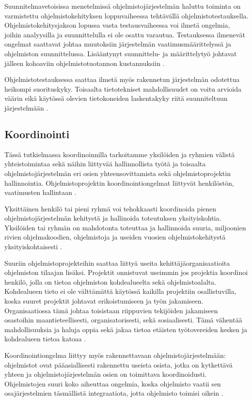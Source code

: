 \documentclass[finnish]{tktltiki2}
\theoremstyle{definition}
\theoremstyle{remark}
\begin{document}
Suunnitelmavetoisissa menetelmissä ohjelmistojärjestelmän haluttu toiminta on varmistettu ohjelmistokehityksen loppuvaiheessa tehtävällä ohjelmistotestauksella. Ohjelmistokehitysjakson lopussa vasta testausvaiheessa voi ilmetä ongelmia, joihin analyysilla ja suunnittelulla ei ole osattu varautua. Testauksessa ilmenevät ongelmat saattavat johtaa muutoksiin järjestelmän vaatimusmäärittelyssä ja ohjelmiston suunnittelussa. Lisääntynyt suunnittelu- ja määrittelytyö johtavat jälleen kohoaviin ohjelmistotuotannon kustannuksiin \cite{ROY70}.

Ohjelmistotestauksessa saattaa ilmetä myös rakennetun järjestelmän odotettua heikompi suorituskyky. Toisaalta tietotekniset mahdollisuudet on voitu arvioida väärin eikä käytössä olevien tietokoneiden laskentakyky riitä suunniteltuun järjestelmään \cite{BOE88}.
　
\subsection{Koordinointi}

Tässä tutkielmassa koordinoinnilla tarkoitamme yksilöiden ja ryhmien välistä yhteistoimintaa sekä näihin liittyvää hallinnollista työtä ja toisaalta ohjelmistojärjestelmän eri osien yhteensovittamista sekä ohjelmistoprojektin hallinnointia. Ohjelmistoprojektin koordinointiongelmat liittyvät henkilöstön, vaatimusten hallintaan \cite{KES95}.

Yksittäinen henkilö tai pieni ryhmä voi tehokkaasti koordinoida pienen ohjelmistojärjestelmän kehitystä ja hallinoida toteutuksen yksityiskohtia. Yksilöiden tai ryhmän on mahdotonta toteuttaa ja hallinnoida suuria, miljoonien rivien ohjelmakoodien, ohjelmistoja ja useiden vuosien ohjelmistokehitystä yksityiskohtaisesti \cite{KES95}.

Suuriin ohjelmistoprojekteihin saattaa liittyä useita kehittäjä\-organisaatioita ohjelmiston tilaajan lisäksi. Projektit onnistuvat useimmin jos projektia koordinoi henkilö, jolla on tietoa ohjelmiston kohdealueelta sekä ohjelmistoalalta. Kohdealueen tieto ei ole välttämättä käytössä kaikilla projektiin osallistuvilla, koska suuret projektit johtavat erikoistumiseen ja työn jakamiseen. Organisaatiossa tämä johtaa toisistaan riippuvien tekijöiden jakamiseen osastoihin maantieteellisesti, organisatorisesti, sekä sosiaalisesti. Tämä vähentää mahdollisuuksia ja haluja oppia sekä jakaa tietoa etäisten työtovereiden kesken ja kohdealueen tietoa katoaa \cite{KES95}.

Koordinointiongelma liittyy myös rakennettavaan ohjelmistojärjestelmään: ohjelmistot ovat pääasiallisesti rakennettu useista osista, jotka on kytkettävä yhteen ja ohjelmistojärjestelmän osien on toimittava koordinoidusti. Ohjelmistojen suuri koko aiheuttaa ongelmia, koska ohjelmisto vaatii sen osajärjestelmien täsmällistä integraatiota, jotta ohjelmisto toimisi oikein  \cite{KES95}.
\end{document}
